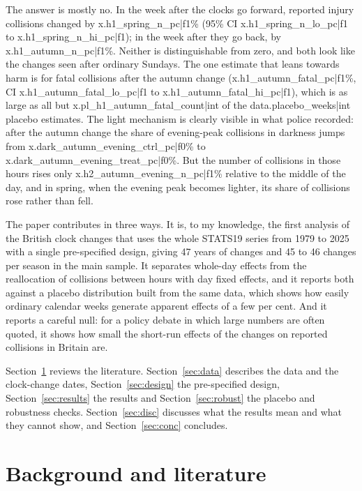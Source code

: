 \documentclass[11pt,a4paper]{article}
\begin{document}
The answer is mostly no. In the week after the clocks go forward, reported injury collisions changed by {{x.h1_spring_n_pc|f1}}\% (95\% CI {{x.h1_spring_n_lo_pc|f1}} to {{x.h1_spring_n_hi_pc|f1}}); in the week after they go back, by {{x.h1_autumn_n_pc|f1}}\%. Neither is distinguishable from zero, and both look like the changes seen after ordinary Sundays. The one estimate that leans towards harm is for fatal collisions after the autumn change ({{x.h1_autumn_fatal_pc|f1}}\%, CI {{x.h1_autumn_fatal_lo_pc|f1}} to {{x.h1_autumn_fatal_hi_pc|f1}}), which is as large as all but {{x.pl_h1_autumn_fatal_count|int}} of the {{data.placebo_weeks|int}} placebo estimates. The light mechanism is clearly visible in what police recorded: after the autumn change the share of evening-peak collisions in darkness jumps from {{x.dark_autumn_evening_ctrl_pc|f0}}\% to {{x.dark_autumn_evening_treat_pc|f0}}\%. But the number of collisions in those hours rises only {{x.h2_autumn_evening_n_pc|f1}}\% relative to the middle of the day, and in spring, when the evening peak becomes lighter, its share of collisions rose rather than fell.

The paper contributes in three ways. It is, to my knowledge, the first analysis of the British clock changes that uses the whole STATS19 series from 1979 to 2025 with a single pre-specified design, giving 47 years of changes and 45 to 46 changes per season in the main sample. It separates whole-day effects from the reallocation of collisions between hours with day fixed effects, and it reports both against a placebo distribution built from the same data, which shows how easily ordinary calendar weeks generate apparent effects of a few per cent. And it reports a careful null: for a policy debate in which large numbers are often quoted, it shows how small the short-run effects of the changes on reported collisions in Britain are.

Section~\ref{sec:lit} reviews the literature. Section~\ref{sec:data} describes the data and the clock-change dates, Section~\ref{sec:design} the pre-specified design, Section~\ref{sec:results} the results and Section~\ref{sec:robust} the placebo and robustness checks. Section~\ref{sec:disc} discusses what the results mean and what they cannot show, and Section~\ref{sec:conc} concludes.

\section{Background and literature}\label{sec:lit}
\end{document}
